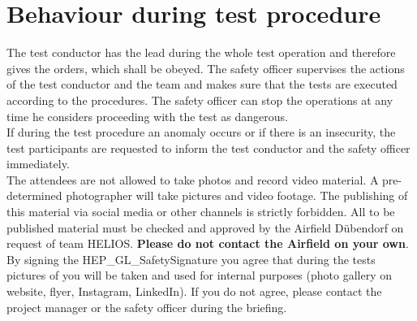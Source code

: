 \documentclass{article}
\begin{document}
\section{Behaviour during test procedure}
The test conductor has the lead during the whole test operation and therefore gives the orders, which shall be obeyed. The safety officer supervises the actions of the test conductor and the team and makes sure that the tests are executed according to the procedures. The safety officer can stop the operations at any time he considers proceeding with the test as dangerous. \\
\noindent
If during the test procedure an anomaly occurs or if there is an insecurity, the test participants are requested to inform the test conductor and the safety officer immediately. \\
\noindent
The attendees are not allowed to take photos and record video material. A pre-determined photographer will take pictures and video footage. The publishing of this material via social media or other channels is strictly forbidden. All to be published material must be checked and approved by the Airfield Dübendorf on request of team HELIOS. \textbf{Please do not contact the Airfield on your own}. \\
\noindent
By signing the HEP\_GL\_SafetySignature you agree that during the tests pictures of you will be taken and used for internal purposes (photo gallery on website, flyer, Instagram, LinkedIn). If you do not agree, please contact the project manager or the safety officer during the briefing.
\end{document}
